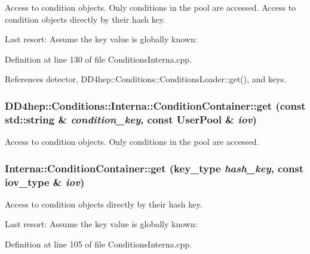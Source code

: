 Access to condition objects. Only conditions in the pool are accessed. Access to condition objects directly by their hash key. 

Last resort: Assume the key value is globally known: 

Definition at line 130 of file ConditionsInterna.cpp.

References detector, DD4hep::Conditions::ConditionsLoader::get(), and keys.\hypertarget{class_d_d4hep_1_1_conditions_1_1_interna_1_1_condition_container_a999f00f1cf10e88559f434210f6a6672}{
\subsubsection[{get}]{ DD4hep::Conditions::Interna::ConditionContainer::get (const std::string \& {\em condition\_\-key}, \/  const {\bf UserPool} \& {\em iov})}}
\label{class_d_d4hep_1_1_conditions_1_1_interna_1_1_condition_container_a999f00f1cf10e88559f434210f6a6672}


Access to condition objects. Only conditions in the pool are accessed. \hypertarget{class_d_d4hep_1_1_conditions_1_1_interna_1_1_condition_container_a49d51d2eee6ff6d8d5f959338a719725}{
\subsubsection[{get}]{ Interna::ConditionContainer::get ({\bf key\_\-type} {\em hash\_\-key}, \/  const {\bf iov\_\-type} \& {\em iov})}}
\label{class_d_d4hep_1_1_conditions_1_1_interna_1_1_condition_container_a49d51d2eee6ff6d8d5f959338a719725}


Access to condition objects directly by their hash key. 

Last resort: Assume the key value is globally known: 

Definition at line 105 of file ConditionsInterna.cpp.

